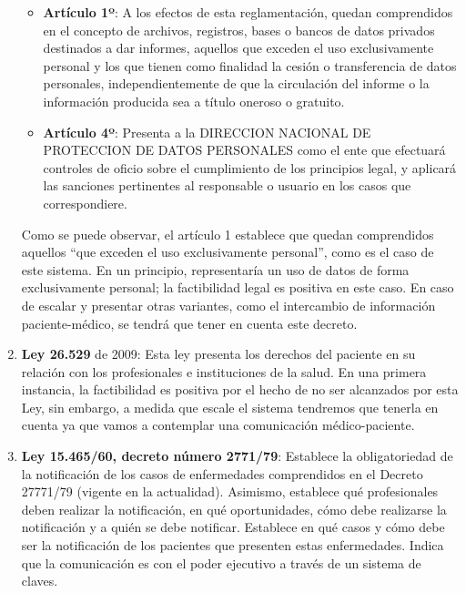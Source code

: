 \begin{enumerate}
        \begin{itemize}
        	\item \textbf{Artículo 1º}: A los efectos de esta reglamentación, quedan comprendidos en el concepto de archivos, registros, bases o bancos de datos privados destinados a dar informes, aquellos que exceden el uso exclusivamente personal y los que tienen como finalidad la cesión o transferencia de datos personales, independientemente de que la circulación del informe o la información producida sea a título oneroso o gratuito.
			\item \textbf{Artículo 4º}: Presenta a la DIRECCION NACIONAL DE PROTECCION DE DATOS PERSONALES como el ente que efectuará controles de oficio sobre el cumplimiento de los principios legal, y aplicará las sanciones pertinentes al responsable o usuario en los casos que correspondiere.
		\end{itemize}
        
        Como se puede observar, el artículo 1 establece que quedan comprendidos aquellos ``que exceden el uso exclusivamente personal'', como es el caso de este sistema.
        En un principio, representaría un uso de datos de forma exclusivamente personal; la factibilidad legal es positiva en este caso.
        En caso de escalar y presentar otras variantes, como el intercambio de información paciente-médico, se tendrá que tener en cuenta este decreto.
        
		\item \textbf{Ley 26.529} de 2009:
        Esta ley presenta los derechos del paciente en su relación con los profesionales e instituciones de la salud. En una primera instancia, la factibilidad es positiva por el hecho de no ser alcanzados por esta Ley, sin embargo, a medida que escale el sistema tendremos que tenerla en cuenta ya que vamos a contemplar una comunicación médico-paciente.
        
        \item \textbf{Ley 15.465/60, decreto número 2771/79}: 
        Establece la obligatoriedad de la notificación de los casos de enfermedades comprendidos en el Decreto 27771/79 (vigente en la actualidad).
        Asimismo, establece qué profesionales deben realizar la notificación, en qué oportunidades, cómo debe realizarse la notificación y a quién se debe notificar. Establece en qué casos y cómo debe ser la notificación de los pacientes que presenten estas enfermedades.
        Indica que la comunicación es con el poder ejecutivo a través de un sistema de claves.
        

\end{enumerate}
